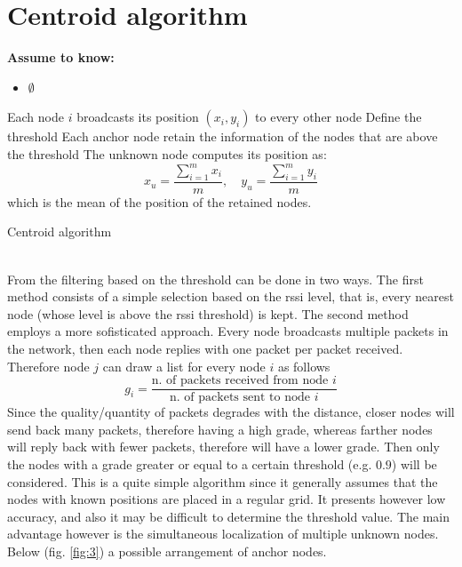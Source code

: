 \documentclass[12pt,twoside]{report}
\begin{document}
\section{Centroid algorithm}
  \begin{center}
  \textbf{Assume to know:}
  \begin{itemize}
    \centering
    \item $\emptyset$
  \end{itemize}
  \end{center}
\begin{algorithm}[H]
\SetAlgoLined
{}
 Each node $i$ broadcasts its position $(x_i,y_i)$ to every other node\;
 Define the threshold\;
 Each anchor node retain the information of the nodes that are above the threshold\;
 The unknown node computes its position as:
 \begin{equation}
     x_u=\frac{\sum_{i=1}^mx_i}{m},\quad y_u=\frac{\sum_{i=1}^my_i}{m}
 \end{equation}
which is the mean of the position of the retained nodes.
 \caption{Centroid algorithm}
\end{algorithm}
\noindent\\From \cite{878533} the filtering based on the threshold can be done in two ways. The first method consists of a simple selection based on the rssi level, that is, every nearest node (whose level is above the rssi threshold) is kept. The second method employs a more sofisticated approach. Every node broadcasts multiple packets in the network, then each node replies with one packet per packet received. Therefore node $j$ can draw a list for every node $i$ as follows 
\begin{equation}
    g_i = \frac{\text{n. of packets received from node $i$}}{\text{n. of packets sent to node $i$}}
\end{equation}
Since the quality/quantity of packets degrades with the distance, closer nodes will send back many packets, therefore having a high grade, whereas farther nodes will reply back with fewer packets, therefore will have a lower grade. Then only the nodes with a grade greater or equal to a certain threshold (e.g. $0.9$) will be considered. This is a quite simple algorithm since it generally assumes that the nodes with known positions are placed in a regular grid. It presents however low accuracy, and also it may be difficult to determine the threshold value. The main advantage however is the simultaneous localization of multiple unknown nodes. Below (fig. \ref{fig:3}) a possible arrangement of anchor nodes.
\end{document}

